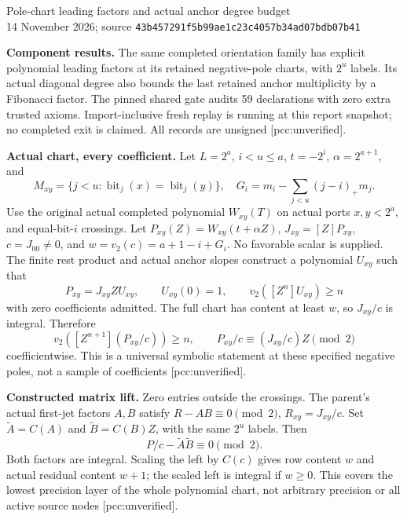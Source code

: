 \documentclass[10pt]{article}
\begin{document}
\begin{center}
{\Large Pole-chart leading factors and actual anchor degree budget}\\[4pt]
14 November 2026; source \texttt{43b457291f5b99ae1c23c4057b34ad07bdb07b41}
\end{center}
\textbf{Component results.} The same completed orientation family has
explicit polynomial leading factors at its retained negative-pole charts,
with $2^u$ labels. Its actual diagonal degree also bounds the last retained
anchor multiplicity by a Fibonacci factor. The pinned shared gate audits
59 declarations with zero extra trusted axioms. Import-inclusive fresh
replay is running at this report snapshot; no completed exit is claimed.
All records are unsigned [pcc:unverified].

\textbf{Actual chart, every coefficient.} Let $L=2^a$, $i<u\le a$,
$t=-2^i$, $\alpha=2^{a+1}$, and
\[
 M_{xy}=\{j<u:\operatorname{bit}_j(x)=\operatorname{bit}_j(y)\},\quad
 G_i=m_i-\sum_{j<u}(j-i)_+m_j.
\]
Use the original actual completed polynomial $W_{xy}(T)$ on actual ports
$x,y<2^a$, and equal-bit-$i$ crossings. Let $P_{xy}(Z)=W_{xy}(t+\alpha Z)$,
$J_{xy}=[Z]P_{xy}$, $c=J_{00}\ne0$, and
$w=v_2(c)=a+1-i+G_i$. No favorable scalar is supplied.
The finite rest product and actual anchor slopes construct a polynomial
$U_{xy}$ such that
\[
 P_{xy}=J_{xy}Z U_{xy},\qquad U_{xy}(0)=1,\qquad
 v_2([Z^n]U_{xy})\ge n
\]
with zero coefficients admitted. The full chart has content at least $w$,
so $J_{xy}/c$ is integral. Therefore
\[
 v_2([Z^{n+1}](P_{xy}/c))\ge n,\qquad
 P_{xy}/c\equiv (J_{xy}/c)Z\pmod 2
\]
coefficientwise. This is a universal symbolic statement at these specified
negative poles, not a sample of coefficients [pcc:unverified].

\textbf{Constructed matrix lift.} Zero entries outside the crossings.
The parent's actual first-jet factors $A,B$ satisfy $R-AB\equiv0\pmod2$,
$R_{xy}=J_{xy}/c$. Set $\widetilde A=C(A)$ and
$\widetilde B=C(B)Z$, with the same $2^u$ labels. Then
\[
 P/c-\widetilde A\widetilde B\equiv0\pmod2.
\]
Both factors are integral. Scaling the left by $C(c)$ gives row content
$w$ and actual residual content $w+1$; the scaled left is integral if
$w\ge0$. This covers the lowest precision layer of the whole polynomial
chart, not arbitrary precision or all active source nodes [pcc:unverified].
\end{document}
